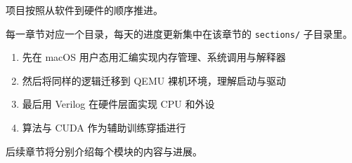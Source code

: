 项目按照从软件到硬件的顺序推进。

每一章节对应一个目录，每天的进度更新集中在该章节的
\texttt{sections/} 子目录里。

\begin{enumerate}
    \item 先在 macOS 用户态用汇编实现内存管理、系统调用与解释器
    \item 然后将同样的逻辑迁移到 QEMU 裸机环境，理解启动与驱动
    \item 最后用 Verilog 在硬件层面实现 CPU 和外设
    \item 算法与 CUDA 作为辅助训练穿插进行
\end{enumerate}

后续章节将分别介绍每个模块的内容与进展。
